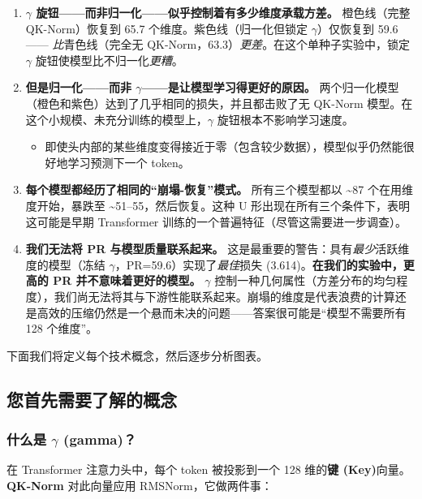 \documentclass[11pt]{ctexart}
\begin{document}
\begin{enumerate}
\item \textbf{$\gamma$ 旋钮——而非归一化——似乎控制着有多少维度承载方差。} 橙色线（完整 QK-Norm）恢复到 65.7 个维度。紫色线（归一化但锁定 $\gamma$）仅恢复到 59.6 —— \textit{比}青色线（完全无 QK-Norm，63.3）\textit{更差}。在这个单种子实验中，锁定 $\gamma$ 旋钮使模型比不归一化\textit{更糟}。

\item \textbf{但是归一化——而非 $\gamma$——是让模型学习得更好的原因。} 两个归一化模型（橙色和紫色）达到了几乎相同的损失，并且都击败了无 QK-Norm 模型。在这个小规模、未充分训练的模型上，$\gamma$ 旋钮根本不影响学习速度。

\begin{itemize}
\item 即使头内部的某些维度变得接近于零（包含较少数据），模型似乎仍然能很好地学习预测下一个 token。
\end{itemize}

\item \textbf{每个模型都经历了相同的“崩塌-恢复”模式。} 所有三个模型都以 \textasciitilde87 个在用维度开始，暴跌至 \textasciitilde51--55，然后恢复。这种 U 形出现在所有三个条件下，表明这可能是早期 Transformer 训练的一个普遍特征（尽管这需要进一步调查）。

\item \textbf{我们无法将 PR 与模型质量联系起来。} 这是最重要的警告：具有\textit{最少}活跃维度的模型（冻结 $\gamma$，PR=59.6）实现了\textit{最佳}损失 (3.614)。\textbf{在我们的实验中，更高的 PR 并不意味着更好的模型。} $\gamma$ 控制一种几何属性（方差分布的均匀程度），我们尚无法将其与下游性能联系起来。崩塌的维度是代表浪费的计算还是高效的压缩仍然是一个悬而未决的问题——答案很可能是“模型不需要所有 128 个维度”。
\end{enumerate}

下面我们将定义每个技术概念，然后逐步分析图表。

\subsection{您首先需要了解的概念}

\subsubsection{什么是 $\gamma$ (gamma)？}

在 Transformer 注意力头中，每个 token 被投影到一个 128 维的\textbf{键 (Key)}向量。 \textbf{QK-Norm} 对此向量应用 RMSNorm，它做两件事：
\end{document}
